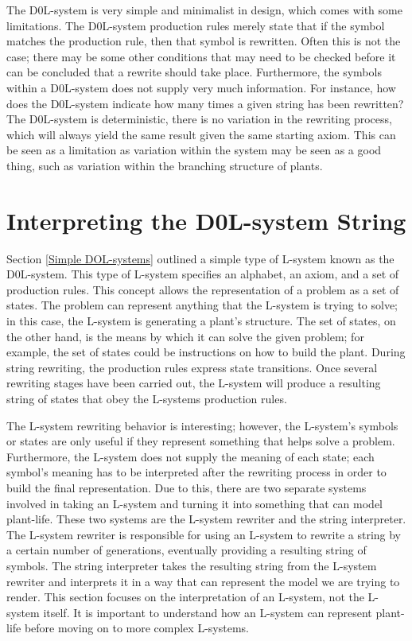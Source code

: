 The D0L-system is very simple and minimalist in design, which comes with some limitations. The D0L-system production rules merely state that if the symbol matches the production rule, then that symbol is rewritten. Often this is not the case; there may be some other conditions that may need to be checked before it can be concluded that a rewrite should take place. Furthermore, the symbols within a D0L-system does not supply very much information. For instance, how does the D0L-system indicate how many times a given string has been rewritten? The D0L-system is deterministic, there is no variation in the rewriting process, which will always yield the same result given the same starting axiom. This can be seen as a limitation as variation within the system may be seen as a good thing, such as variation within the branching structure of plants. 

\section{Interpreting the D0L-system String} \label{Interpreting DOL-system}

Section \ref{Simple DOL-systems} outlined a simple type of L-system known as the D0L-system. This type of L-system specifies an alphabet, an axiom, and a set of production rules. This concept allows the representation of a problem as a set of states. The problem can represent anything that the L-system is trying to solve; in this case, the L-system is generating a plant's structure. The set of states, on the other hand, is the means by which it can solve the given problem; for example, the set of states could be instructions on how to build the plant. During string rewriting, the production rules express state transitions. Once several rewriting stages have been carried out, the L-system will produce a resulting string of states that obey the L-systems production rules. 

\newpage

The L-system rewriting behavior is interesting; however, the L-system's symbols or states are only useful if they represent something that helps solve a problem. Furthermore, the L-system does not supply the meaning of each state; each symbol's meaning has to be interpreted after the rewriting process in order to build the final representation. Due to this, there are two separate systems involved in taking an L-system and turning it into something that can model plant-life. These two systems are the L-system rewriter and the string interpreter. The L-system rewriter is responsible for using an L-system to rewrite a string by a certain number of generations, eventually providing a resulting string of symbols. The string interpreter takes the resulting string from the L-system rewriter and interprets it in a way that can represent the model we are trying to render. This section focuses on the interpretation of an L-system, not the L-system itself. It is important to understand how an L-system can represent plant-life before moving on to more complex L-systems.

